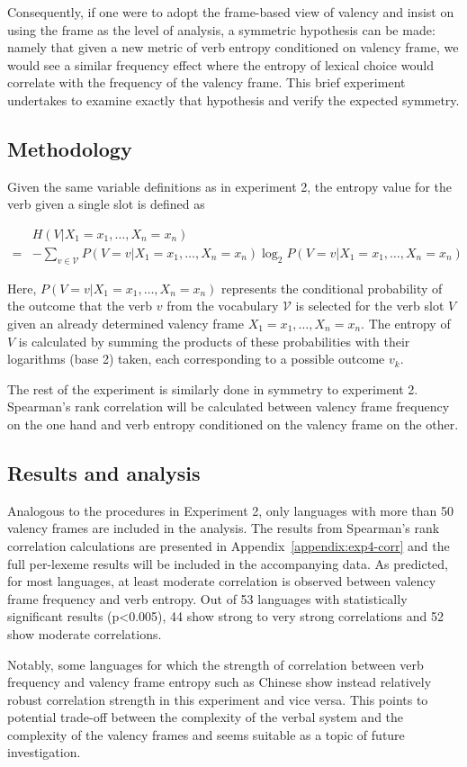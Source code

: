 Consequently, if one were to adopt the frame-based view of valency and insist on using the frame as the level of analysis, a symmetric hypothesis can be made: namely that given a new metric of verb entropy conditioned on valency frame, we would see a similar frequency effect where the entropy of lexical choice would correlate with the frequency of the valency frame. This brief experiment undertakes to examine exactly that hypothesis and verify the expected symmetry.

\subsection{Methodology}

Given the same variable definitions as in experiment 2, the entropy value for the verb given a single slot is defined as

\begin{equation*}
  \begin{split}
   & H(V|X_1=x_1,\ldots,X_n=x_n)  \\
  =&-\sum\limits_{v\in{}\mathcal{V}}{P(V=v|X_1=x_1,\ldots,X_n=x_n)\log_2P(V=v|X_1=x_1,\ldots,X_n=x_n)}
  \end{split}
\end{equation*}

Here, $P(V=v|X_1=x_1,\ldots,X_n=x_n)$ represents the conditional probability of the outcome that the verb $v$ from the vocabulary $\mathcal{V}$ is selected for the verb slot $V$ given an already determined valency frame $X_1=x_1,\ldots,X_n=x_n$. The entropy of $V$ is calculated by summing the products of these probabilities with their logarithms (base 2) taken, each corresponding to a possible outcome $v_k$.

The rest of the experiment is similarly done in symmetry to experiment 2. Spearman's rank correlation will be calculated between valency frame frequency on the one hand and verb entropy conditioned on the valency frame on the other. 

\subsection{Results and analysis}

Analogous to the procedures in Experiment 2, only languages with more than 50 valency frames are included in the analysis. The results from Spearman's rank correlation calculations are presented in Appendix~\ref{appendix:exp4-corr} and the full per-lexeme results will be included in the accompanying data. As predicted, for most languages, at least moderate correlation is observed between valency frame frequency and verb entropy. Out of 53 languages with statistically significant results (p<0.005), 44 show strong to very strong correlations and 52 show moderate correlations.

Notably, some languages for which the strength of correlation between verb frequency and valency frame entropy such as Chinese show instead relatively robust correlation strength in this experiment and vice versa. This points to potential trade-off between the complexity of the verbal system and the complexity of the valency frames and seems suitable as a topic of future investigation.